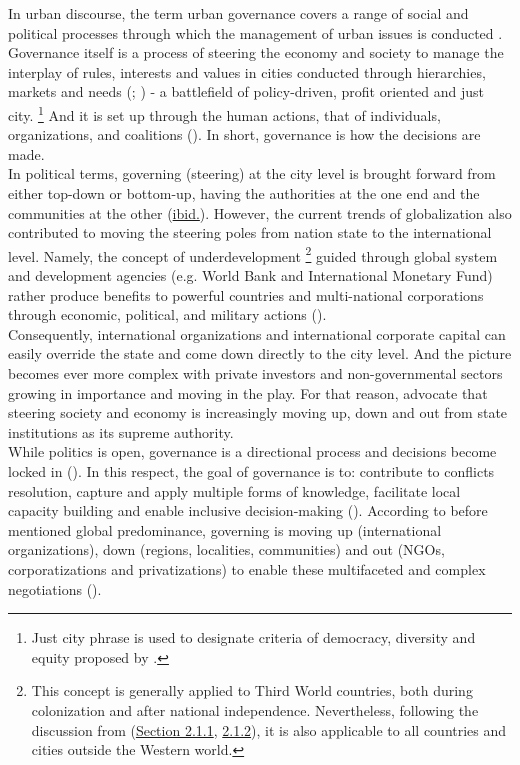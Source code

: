 \documentclass[11pt]{report}
\begin{document}
In urban discourse, the term urban governance covers a range of social and political processes through which the management of urban issues is conducted \cite{Healey 1997 Collaborative planning}.
Governance itself is a process of steering the economy and society to manage the interplay of rules, interests and values in cities conducted through hierarchies, markets and needs (\href{Pierre}{\cite{Pierre_Debating_2000}}; \href{Pierre}{\cite{Pierre_Governance_2000}}) - a battlefield of policy-driven, profit oriented and just city.
\footnote{Just city phrase is used to designate criteria of democracy, diversity and equity proposed by \cite{Farnstein (Just city)}.}
And it is set up through the human actions, that of individuals, organizations, and coalitions (\href{Hudson}{\cite{Hudson and Leftwich 2014}}).
In short, governance is how the decisions are made.
\\

In political terms, governing (steering) at the city level is brought forward from either top-down or bottom-up, having the authorities at the one end and the communities at the other (\href{Hudson}{ibid.}).
However, the current trends of globalization also contributed to moving the steering poles from nation state to the international level.
Namely, the concept of underdevelopment
\footnote{This concept is generally applied to Third World countries, both during colonization and after national independence. Nevertheless, following the discussion from (\href{Section 2.1.1}{Section 2.1.1}, \href{Section 2.1.2}{2.1.2}), it is also applicable to all countries and cities outside the Western world.}
guided through global system and development agencies (e.g. World Bank and International Monetary Fund) rather produce benefits to powerful countries and multi-national corporations through economic, political, and military actions (\cite{Sears 2008}).
\\

Consequently, international organizations and international corporate capital can easily override the state and come down directly to the city level.
And the picture becomes ever more complex with private investors and non-governmental sectors growing in importance and moving in the play.
For that reason, \href{Pierre}{\cite{Pierre and Peters (2000)}} advocate that steering society and economy is increasingly moving up, down and out from  state institutions as its supreme authority.
\\

While politics is open, governance is a directional process and decisions become locked in (\href{Hudson}{\cite{Hudson and Leftwich 2014}}).
In this respect, the goal of governance is to: contribute to conflicts resolution, capture and apply multiple  forms  of  knowledge, facilitate local capacity building and enable inclusive decision-making (\href{Mathur}{\cite{Mathur et al., 2007}}).
According to before mentioned global predominance, governing is moving up (international organizations), down (regions, localities, communities) and out (NGOs, corporatizations and privatizations) to enable these multifaceted and complex negotiations (\href{Pierre}{\citealt{Pierre_Governance_2000}}).
\\
\end{document}
